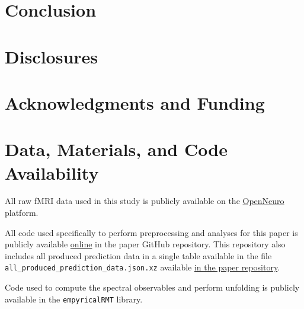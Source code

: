 \documentclass[12pt]{spieman}  %
\newcommand{\code}[1]{\small\texttt{#1}\normalsize}
\begin{document}
\begin{spacing}{2}
\section{Conclusion}

\section{Disclosures}

\section{Acknowledgments and Funding}

\section{Data, Materials, and Code Availability}
\label{sec:data-and-code}

All raw fMRI data used in this study is publicly available on the
\href{https://openneuro.org/}{OpenNeuro}
platform\cite{poldrackOpenfMRIOpenSharing2017,
markiewiczOpenNeuroResourceSharing2021}.

All code used specifically to perform preprocessing and analyses for this paper
is publicly available \href{https://github.com/DM-Berger/random-matrix-fmri/}{online} in
the paper GitHub repository\cite{dm-bergerDMBergerRandommatrixfmriPaper2022}.
This repository also includes all produced prediction data in a single table
available in the file \code{all\_produced\_prediction\_data.json.xz} available
\href{https://github.com/DM-Berger/random-matrix-fmri/blob/master/all\_produced\_prediction\_data.json.xz}{in
the paper repository}.

Code used to compute the spectral observables and
perform unfolding is publicly available in the
\href{https://github.com/stfxecutables/empyricalRMT}\code{empyricalRMT}
library\cite{dm-bergerStfxecutablesEmpyricalRMTV12022}.






\end{spacing}
\end{document}
